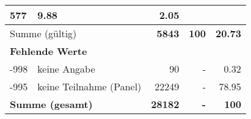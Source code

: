 \begin{longtable}{lXrrr}
       \num{577} &
       \num[round-mode=places,round-precision=2]{9.88} &
         \num[round-mode=places,round-precision=2]{2.05} \\
     \midrule
     \multicolumn{2}{l}{Summe (gültig)} &
       \textbf{\num{5843}} &
     \textbf{100} &
       \textbf{\num[round-mode=places,round-precision=2]{20.73}} \\
     \multicolumn{5}{l}{\textbf{Fehlende Werte}}\\
       -998 &
       keine Angabe &
         \num{90} &
        - &
         \num[round-mode=places,round-precision=2]{0.32} \\
       -995 &
       keine Teilnahme (Panel) &
         \num{22249} &
        - &
         \num[round-mode=places,round-precision=2]{78.95} \\
     \midrule
     \multicolumn{2}{l}{\textbf{Summe (gesamt)}} &
          \textbf{\num{28182}} &
        \textbf{-} &
        \textbf{100} \\
     \bottomrule
     \end{longtable}
     
